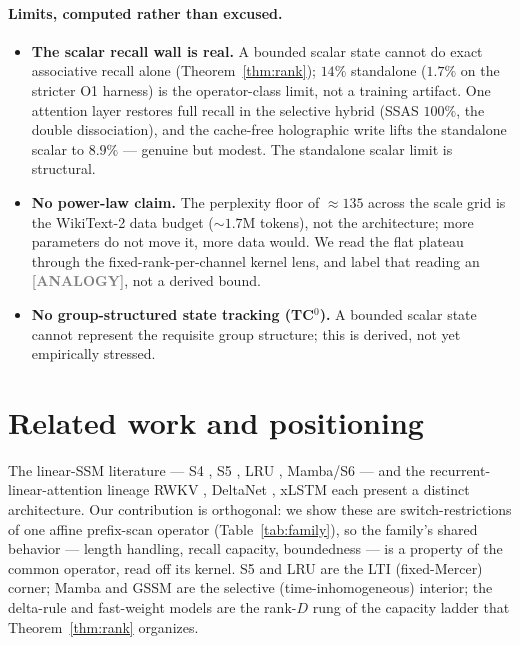 \documentclass[11pt]{article}
\theoremstyle{definition}
\newcommand{\ANALOGY}{\textcolor{Gray}{\textbf{[ANALOGY]}}}
\begin{document}
\paragraph{Limits, computed rather than excused.}
\begin{itemize}
\item \textbf{The scalar recall wall is real.} A bounded scalar state cannot do exact
associative recall alone (Theorem~\ref{thm:rank}); $14\%$ standalone ($1.7\%$ on the stricter
O1 harness) is the operator-class limit, not a training artifact. One attention layer restores
full recall in the selective hybrid (SSAS $100\%$, the double dissociation), and the
cache-free holographic write lifts the standalone scalar to $8.9\%$ --- genuine but modest.
The standalone scalar limit is structural.
\item \textbf{No power-law claim.} The perplexity floor of $\approx135$ across the scale grid is
the WikiText-2 data budget ($\sim\!1.7$M tokens), not the architecture; more parameters do not
move it, more data would. We read the flat plateau through the fixed-rank-per-channel kernel
lens, and label that reading an \ANALOGY{}, not a derived bound.
\item \textbf{No group-structured state tracking (TC$^0$).} A bounded scalar state cannot
represent the requisite group structure; this is derived, not yet empirically stressed.
\end{itemize}

\section{Related work and positioning}

The linear-SSM literature --- S4 \cite{gu2022s4}, S5 \cite{smith2023s5}, LRU
\cite{orvieto2023lru}, Mamba/S6 \cite{gu2023mamba} --- and the recurrent-linear-attention
lineage RWKV \cite{peng2023rwkv}, DeltaNet \cite{yang2024deltanet}, xLSTM \cite{beck2024xlstm}
each present a distinct architecture. Our contribution is orthogonal: we show these are
switch-restrictions of one affine prefix-scan operator (Table~\ref{tab:family}), so the family's
shared behavior --- length handling, recall capacity, boundedness --- is a property of the common
operator, read off its kernel. S5 and LRU are the LTI (fixed-Mercer) corner; Mamba and GSSM are
the selective (time-inhomogeneous) interior; the delta-rule and fast-weight models
\cite{yang2024deltanet} are the rank-$D$ rung of the capacity ladder that
Theorem~\ref{thm:rank} organizes.
\end{document}
